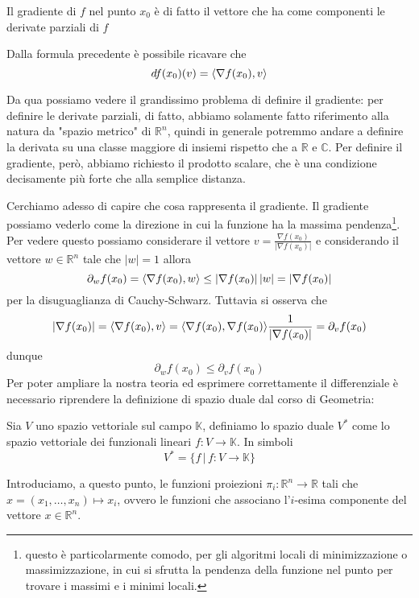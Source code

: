 \begin{remark}
Il gradiente di $f$ nel punto $x_0$ è di fatto il vettore che ha come componenti le derivate parziali di $f$
\end{remark}
\noindent Dalla formula precedente è possibile ricavare che
$$
df(x_0)(v) = \langle \nabla{f(x_0)}, v \rangle
$$
\begin{remark}
Da qua possiamo vedere il grandissimo problema di definire il gradiente: per definire le derivate parziali, di fatto, abbiamo solamente fatto riferimento alla natura da "spazio metrico" di $\mathbb{R}^n$, quindi in generale potremmo andare a definire la derivata su una classe maggiore di insiemi rispetto che a $\mathbb{R}$ e $\mathbb{C}$. Per definire il gradiente, però, abbiamo richiesto il prodotto scalare, che è una condizione decisamente più forte che alla semplice distanza.
\end{remark}
\noindent Cerchiamo adesso di capire che cosa rappresenta il gradiente. Il gradiente possiamo vederlo come la direzione in cui la funzione ha la massima pendenza\footnote{questo è particolarmente comodo, per gli algoritmi locali di minimizzazione o massimizzazione, in cui si sfrutta la pendenza della funzione nel punto per trovare i massimi e i minimi locali.}. Per vedere questo possiamo considerare il vettore $v = \frac{\nabla f(x_0)}{|\nabla f(x_0)|}$ e considerando il vettore $w \in \mathbb{R}^n$ tale che $|w| = 1$ allora
$$
\partial_w f(x_0) = \langle \nabla{f(x_0)}, w \rangle \leq |\nabla{f(x_0)}| \, |w| = |\nabla{f(x_0)}|
$$
per la disuguaglianza di Cauchy-Schwarz. Tuttavia si osserva che
$$
|\nabla{f(x_0)}| = \langle \nabla{f(x_0)}, v \rangle = \langle \nabla{f(x_0)}, \nabla{f(x_0)} \rangle \frac{1}{|\nabla{f(x_0)}|} = \partial_v f(x_0)
$$
dunque
$$
\partial_w f(x_0) \leq \partial_v f(x_0)
$$
Per poter ampliare la nostra teoria ed esprimere correttamente il differenziale è necessario riprendere la definizione di spazio duale dal corso di Geometria:
\begin{definition}
Sia $V$ uno spazio vettoriale sul campo $\mathbb{K}$, definiamo lo spazio duale $V^{*}$ come lo spazio vettoriale dei funzionali lineari $f: V \to \mathbb{K}$. In simboli
$$
V^{*} = \{f \, | \, f: V \to \mathbb{K} \}
$$
\end{definition}
\noindent Introduciamo, a questo punto, le funzioni proiezioni $\pi_i: \mathbb{R}^n \to \mathbb{R}$ tali che $x = (x_1, \ldots, x_n) \mapsto x_i$, ovvero le funzioni che associano l'$i$-esima componente del vettore $x \in \mathbb{R}^n$. \\
